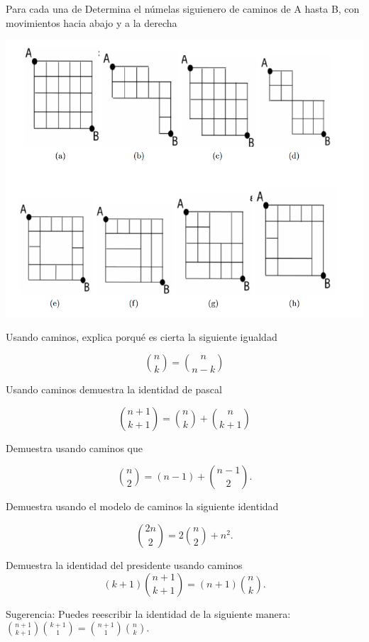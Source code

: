 \begin{problema}
    Para cada una de Determina el númelas siguienero de caminos de A hasta B, con movimientos hacia abajo y a la derecha

    
    \begin{center}
        \includegraphics[scale=0.9]{Imagenes/IMG4/cuadricula_2.png}
    \end{center}






    
\end{problema}

    \begin{problema}
        Usando caminos, explica porqué es cierta la siguiente igualdad

        $$\binom{n}{k}=\binom{n}{n-k}$$
    \end{problema}


    \begin{problema}
        Usando caminos demuestra la identidad de pascal

        $$\binom{n+1}{k+1}=\binom{n}{k}+\binom{n}{k+1}$$ 
    \end{problema}


        \begin{problema}
        Demuestra usando caminos que 

        $$\binom{n}{2}=(n-1)+\binom{n-1}{2}.$$
    \end{problema}


    \begin{problema}
        Demuestra usando el modelo de caminos la siguiente identidad

        $$\binom{2n}{2}=2\binom{n}{2}+n^2.$$
    \end{problema}



    \begin{problema}
        Demuestra la identidad del presidente usando caminos $$(k+1)\binom{n+1}{k+1}=(n+1)\binom{n}{k}.$$

        Sugerencia: Puedes reescribir la identidad de la siguiente manera:$\binom{n+1}{k+1}\binom{k+1}{1}=\binom{n+1}{1}\binom{n}{k}.$
    \end{problema}


